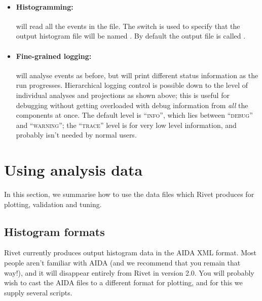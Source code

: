 \documentclass{JHEP3}
\begin{document}
\begin{itemize}
\item \paragraph{Histogramming:}{ will read all the
    events in the  file. The  switch is used to specify
    that the output histogram file will be named . By default the
    output file is called .}

\item \paragraph{Fine-grained logging:}{
    will analyse events as before, but will print different status
    information as the run progresses. Hierarchical logging control is possible
    down to the level of individual analyses and projections as shown above;
    this is useful for debugging without getting overloaded with debug
    information from \emph{all} the components at once. The default level is
    ``\textsc{info}'', which lies between ``\textsc{debug}'' and
    ``\textsc{warning}''; the ``\textsc{trace}'' level is for very low level
    information, and probably isn't needed by normal users.}

\end{itemize}



\section{Using analysis data}

In this section, we summarise how to use the data files which Rivet produces for
plotting, validation and tuning.

\subsection{Histogram formats}

Rivet currently produces output histogram data in the AIDA XML format. Most
people aren't familiar with AIDA (and we recommend that you remain that way!),
and it will disappear entirely from Rivet in version 2.0. You will probably
wish to cast the AIDA files to a different format for plotting, and for this we
supply several scripts.
\end{document}
